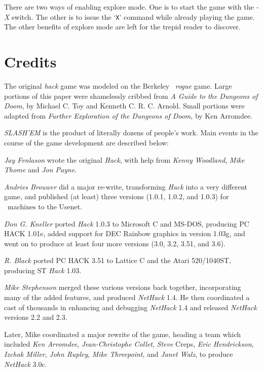 There are two ways of enabling explore mode.  One is to start the game
with the
{\it -X\/} 
switch.  The other is to issue the `{\tt X}' command while already playing
the game.  The other benefits of explore mode are left for the trepid
reader to discover.

\section{Credits}


The original {\it hack\/} game was modeled on the Berkeley 
\UNIX\ 
{\it rogue\/} game.  Large portions of this paper were shamelessly
cribbed from {\it A Guide to the Dungeons of Doom}, by Michael C. Toy
and Kenneth C. R. C. Arnold.  Small portions were adapted from
{\it Further Exploration of the Dungeons of Doom}, by Ken Arromdee.

{\it SLASH'EM\/} is the product of literally dozens of people's work.
Main events in the course of the game development are described below:


{\it Jay Fenlason\/} wrote the original {\it Hack}, with help from
{\it Kenny Woodland}, {\it Mike Thome\/} and {\it Jon Payne}.

{\it Andries Brouwer\/} did a major re-write, transforming {\it Hack\/} into a
very different game, and published (at least) three versions (1.0.1,
1.0.2, and 1.0.3) for
\UNIX\ 
machines to the Usenet.

{\it Don G. Kneller\/} ported {\it Hack\/} 1.0.3 to Microsoft C and MS-DOS, producing PC
HACK 1.01e, added support for DEC Rainbow graphics in version 1.03g, and went
on to produce at least four more versions (3.0, 3.2, 3.51, and 3.6).

{\it R. Black\/} ported PC HACK 3.51 to Lattice C and the Atari 520/1040ST,
producing ST {\it Hack\/} 1.03.

{\it Mike Stephenson\/} merged these various versions back together,
incorporating many of the added features, and produced {\it NetHack\/} 1.4.
He then coordinated a cast of thousands in enhancing and debugging
{\it NetHack\/} 1.4 and released {\it NetHack\/} versions 2.2 and 2.3.

Later, Mike coordinated a major rewrite of the game, heading a
team which included {\it Ken Arromdee}, {\it Jean-Christophe Collet}, {\it Steve}
Creps, {\it Eric Hendrickson}, {\it Izchak Miller}, {\it John Rupley},
{\it Mike Threepoint}, and {\it Janet Walz}, to produce {\it NetHack\/} 3.0c.

